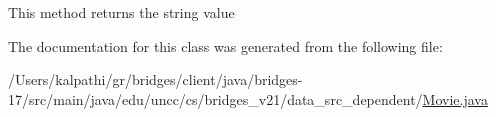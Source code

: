 This method returns the string value 

The documentation for this class was generated from the following file\+:\begin{DoxyCompactItemize}
\item 
/\+Users/kalpathi/gr/bridges/client/java/bridges-\/17/src/main/java/edu/uncc/cs/bridges\+\_\+v21/data\+\_\+src\+\_\+dependent/\mbox{\hyperlink{_movie_8java}{Movie.\+java}}\end{DoxyCompactItemize}
